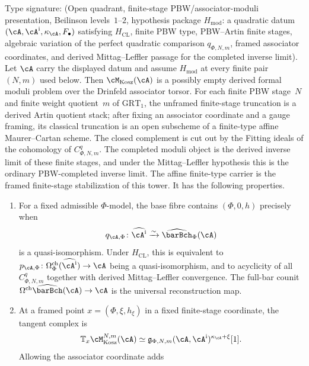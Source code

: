 \begin{theorem}
\label{v1-thm:kms-moduli}
\ClaimStatusConditional
Type signature: \textup{(}Open quadrant, finite-stage
PBW/associator-moduli presentation, Beilinson levels~$1$--$2$,
hypothesis package $H_{\mathrm{mod}}$: a quadratic datum
$(\cA,\cA^{\mathrm i},\kappa_\cA,F_\bullet)$ satisfying
$H_{\mathrm{CL}}$, finite PBW type, PBW--Artin finite stages,
algebraic variation of the perfect quadratic comparison
$q_{\Phi,N,m}$, framed associator coordinates, and derived
Mittag--Leffler passage for the completed inverse limit\textup{)}.
Let $\cA$ carry the displayed datum and assume
$H_{\mathrm{mod}}$ at every finite pair~$(N,m)$ used below.
Then $\cM_{\mathrm{Kosz}}(\cA)$ is a possibly empty derived
formal moduli problem over the Drinfeld associator torsor. For
each finite PBW stage~$N$ and finite weight quotient~$m$ of
$\mathrm{GRT}_1$, the unframed finite-stage truncation is a
derived Artin quotient stack; after fixing an associator
coordinate and a gauge framing, its classical truncation is an
open subscheme of a finite-type affine Maurer--Cartan scheme.
The closed complement is cut out by the Fitting ideals of the
cohomology of $C^q_{\Phi,N,m}$. The completed moduli
object is the derived inverse limit of these finite stages, and
under the Mittag--Leffler hypothesis this is the ordinary
PBW-completed inverse limit.  The affine finite-type carrier is the
framed finite-stage stabilization of this tower.  It has the
following properties.
\begin{enumerate}[label=\textup{(A\arabic*)},leftmargin=3em]
\item\label{v1-item:kms-A1}
 For a fixed admissible $\Phi$-model, the base fibre contains
 $(\Phi,0,h)$ precisely when
 \[
 q_{\cA,\Phi}\colon\widehat{\cA^{\mathrm i}}
 \xrightarrow{\sim}\widehat{\barBch}_\Phi(\cA)
 \]
 is a quasi-isomorphism.  Under $H_{\mathrm{CL}}$, this is
 equivalent to
 $p_{\cA,\Phi}\colon\Omega^{\mathrm{ch}}_\Phi
 (\widehat{\cA^{\mathrm i}})\to\cA$ being a quasi-isomorphism,
 and to acyclicity of all $C^q_{\Phi,N,m}$ together with derived
 Mittag--Leffler convergence.  The full-bar counit
 $\Omega^{\mathrm{ch}}\widehat{\barBch}(\cA)\to\cA$ is the
 universal reconstruction map.
\item\label{v1-item:kms-A2}
 At a framed point $x=(\Phi,\xi,h_\xi)$ in a fixed finite-stage
 coordinate, the tangent complex is
 \[
 \mathbb T_x\cM_{\mathrm{Kosz}}^{N,m}(\cA)
 \simeq \mathfrak g_{\Phi,N,m}
 (\cA,\cA^{\mathrm i})^{\kappa_\cA+\xi}[1].
 \]
 Allowing the associator coordinate adds

\end{enumerate}
\end{theorem}

